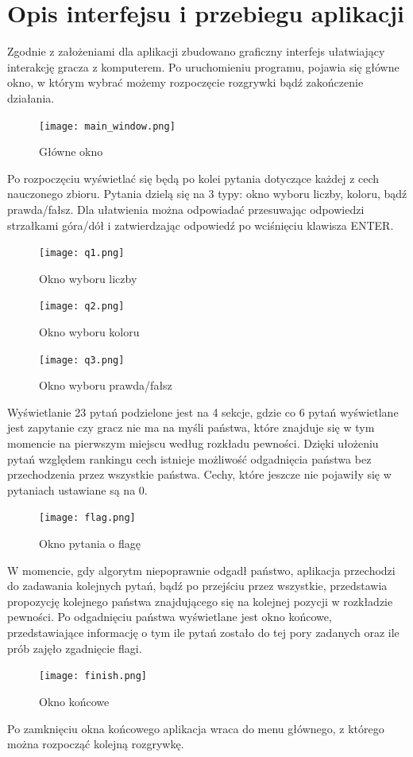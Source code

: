 \section{Opis interfejsu i przebiegu aplikacji}

Zgodnie z założeniami dla aplikacji zbudowano graficzny interfejs ułatwiający interakcję gracza z komputerem. Po uruchomieniu programu, pojawia się główne okno, w którym wybrać możemy rozpoczęcie rozgrywki bądź zakończenie działania.

\begin{figure}[h!]
	\centering
	\texttt{[image: main\_window.png]}
	\label{main-window}
	\caption{Główne okno}
\end{figure}

Po rozpoczęciu wyświetlać się będą po kolei pytania dotyczące każdej z cech nauczonego zbioru. Pytania dzielą się na 3 typy: okno wyboru liczby, koloru, bądź prawda/fałsz. Dla ułatwienia można odpowiadać przesuwając odpowiedzi strzałkami góra/dół i zatwierdzając odpowiedź po wciśnięciu klawisza ENTER.

\begin{figure}[h!]
	\centering
	\texttt{[image: q1.png]}
	\label{q1}
	\caption{Okno wyboru liczby}
\end{figure}

\begin{figure}[h!]
	\centering
	\texttt{[image: q2.png]}
	\label{q2}
	\caption{Okno wyboru koloru}
\end{figure}

\newpage

\begin{figure}[h!]
	\centering
	\texttt{[image: q3.png]}
	\label{q3}
	\caption{Okno wyboru prawda/fałsz}
\end{figure}

Wyświetlanie 23 pytań podzielone jest na 4 sekcje, gdzie co 6 pytań wyświetlane jest zapytanie czy gracz nie ma na myśli państwa, które znajduje się w tym momencie na pierwszym miejscu według rozkładu pewności. Dzięki ułożeniu pytań względem rankingu cech istnieje możliwość odgadnięcia państwa bez przechodzenia przez wszystkie państwa. Cechy, które jeszcze nie pojawiły się w pytaniach ustawiane są na 0.

\begin{figure}[h!]
	\centering
	\texttt{[image: flag.png]}
	\label{flag}
	\caption{Okno pytania o flagę}
\end{figure}

W momencie, gdy algorytm niepoprawnie odgadł państwo, aplikacja przechodzi do zadawania kolejnych pytań, bądź po przejściu przez wszystkie, przedstawia propozycję kolejnego państwa znajdującego się na kolejnej pozycji w rozkładzie pewności. Po odgadnięciu państwa wyświetlane jest okno końcowe, przedstawiające informację o tym ile pytań zostało do tej pory zadanych oraz ile prób zajęło zgadnięcie flagi.

\begin{figure}[h!]
	\centering
	\texttt{[image: finish.png]}
	\label{finish}
	\caption{Okno końcowe}
\end{figure}

Po zamknięciu okna końcowego aplikacja wraca do menu głównego, z którego można rozpocząć kolejną rozgrywkę.